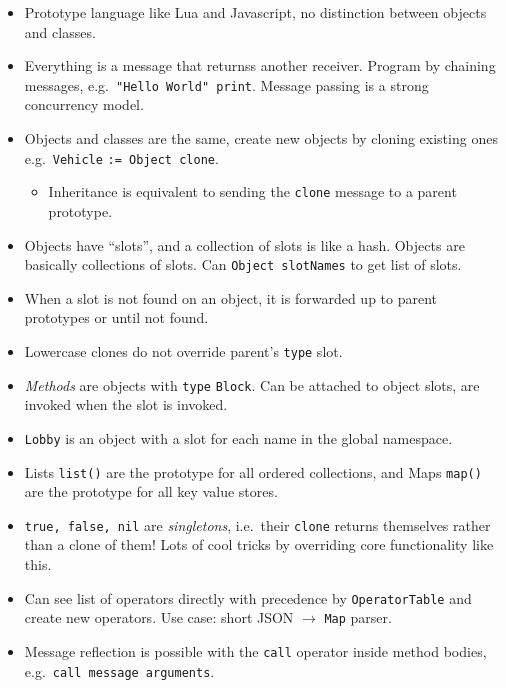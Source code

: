 \documentclass[10pt, twocolumn, landscape]{article}
\begin{document}
\begin{itemize}
    \item Prototype language like Lua and Javascript, no distinction between
        objects and classes.
    \item Everything is a message that returnss another receiver. Program by
        chaining messages, e.g.\ \texttt{"Hello World" print}. Message passing
        is a strong concurrency model.
    \item Objects and classes are the same, create new objects by cloning
        existing ones e.g.\ \texttt{Vehicle} \texttt{:= Object clone}.
        \begin{itemize}
            \item Inheritance is equivalent to sending the \texttt{clone}
                message to a parent prototype.
        \end{itemize}
    \item Objects have ``slots'', and a collection of slots is like a hash.
        Objects are basically collections of slots. Can \texttt{Object
        slotNames} to get list of slots.
    \item When a slot is not found on an object, it is forwarded up to parent
        prototypes or until not found.
    \item Lowercase clones do not override parent's \texttt{type} slot.
    \item \emph{Methods} are objects with \texttt{type} \texttt{Block}. Can be
        attached to object slots, are invoked when the slot is invoked.
    \item \texttt{Lobby} is an object with a slot for each name in the global
        namespace.
    \item Lists \texttt{list()} are the prototype for all ordered collections,
        and Maps \texttt{map()} are the prototype for all key value stores.
    \item \texttt{true, false, nil} are \emph{singletons}, i.e.\ their
        \texttt{clone} returns themselves rather than a clone of them! Lots of
        cool tricks by overriding core functionality like this.
    \item Can see list of operators directly with precedence by
        \texttt{OperatorTable} and create new operators. Use case: short JSON
        $\to$ \texttt{Map} parser.
    \item Message reflection is possible with the \texttt{call} operator inside
        method bodies, e.g.\ \texttt{call message arguments}.
        \begin{itemize}

\end{itemize}
\end{itemize}
\end{document}
